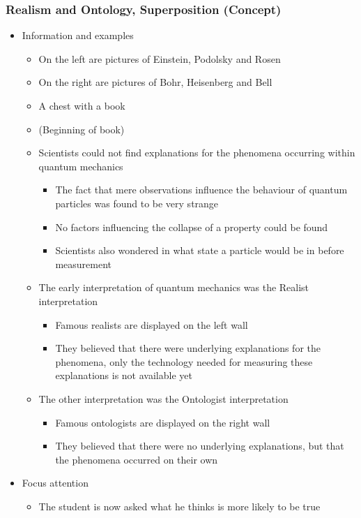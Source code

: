 \documentclass[11pt,twoside]{report} %
\begin{document}
\subsubsection{Realism and Ontology, Superposition (Concept)}
\begin{itemize}
	\item Information and examples
	\begin{itemize}
		\item On the left are pictures of Einstein, Podolsky and Rosen
		\item On the right are pictures of Bohr, Heisenberg and Bell
		\item A chest with a book
		\item (Beginning of book)
		\item Scientists could not find explanations for the phenomena occurring within quantum mechanics
		\begin{itemize}
			\item The fact that mere observations influence the behaviour of quantum particles was found to be very strange
			\item No factors influencing the collapse of a property could be found
			\item Scientists also wondered in what state a particle would be in before measurement
		\end{itemize}
		\item The early interpretation of quantum mechanics was the Realist interpretation
		\begin{itemize}
			\item Famous realists are displayed on the left wall
			\item They believed that there were underlying explanations for the phenomena, only the technology needed for measuring these explanations is not available yet
		\end{itemize}
		\item The other interpretation was the Ontologist interpretation
		\begin{itemize}
			\item Famous ontologists are displayed on the right wall
			\item They believed that there were no underlying explanations, but that the phenomena occurred on their own
		\end{itemize}
	\end{itemize}
	\item Focus attention
	\begin{itemize}
		\item The student is now asked what he thinks is more likely to be true

\end{itemize}
\end{itemize}
\end{document}
